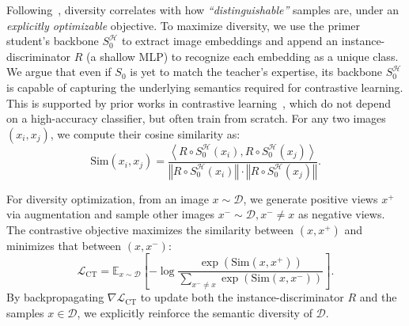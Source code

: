 \begin{foldable} %
  Following~\cite{fang2021contrastive}, diversity correlates with how \textit{``distinguishable''} samples are, under an \textit{explicitly optimizable} objective.
  To maximize diversity, we use the primer student's backbone $S_{0}^\mathcal{H}$ to extract image embeddings and append an instance-discriminator $R$ (a shallow MLP) to recognize each embedding as a unique class.
  We argue that even if $S_0$ is yet to match the teacher's expertise, its backbone $S_{0}^\mathcal{H}$ is capable of capturing the underlying semantics required for contrastive learning.
  This is supported by prior works in contrastive learning~\cite{chen2020simple,he2020momentum,zbontar2021barlow}, which do not depend on a high-accuracy classifier, but often train from scratch.
  For any two images $(x_i, x_j)$, we compute their cosine similarity as:
  \begin{equation}
    \text{Sim}\left(x_i, x_j\right)=
    \frac{ \left\langle R \circ S_{0}^\mathcal{H}(x_i), R \circ S_{0}^\mathcal{H}(x_j)\right\rangle }
    { \left\Vert R \circ S_{0}^\mathcal{H}(x_i) \right\Vert \cdot \left\Vert R \circ S_{0}^\mathcal{H}(x_j) \right\Vert }.
  \end{equation}
\end{foldable}

\begin{foldable} %
  For diversity optimization, from an image $x \sim \mathcal{D}$, we generate positive views $x^{+}$ via augmentation and sample other images $x^{-} \sim \mathcal{D}, x^{-} \neq x$ as negative views.
  The contrastive objective maximizes the similarity between $(x, x^{+})$ and minimizes that between $(x, x^{-})$:
  \begin{equation} \label{eq:loss-contrastive}
    \mathcal{L}_\text{CT} = \mathbb{E}_{x \sim \mathcal{D}} \left[
      -\log \frac{ \exp\left( \text{Sim}(x, x^{+}) \right) }{ \sum_{x^{-} \ne x} \exp\left( \text{Sim}(x, x^{-}) \right) }
    \right].
  \end{equation}
  By backpropagating $\nabla\mathcal{L}_\text{CT}$ to update both the instance-discriminator $R$ and the samples $x \in \mathcal{D}$, we explicitly reinforce the semantic diversity of $\mathcal{D}$.
\end{foldable}

